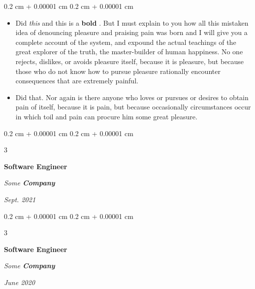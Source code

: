 \documentclass[10pt, letterpaper]{article}
\newenvironment{highlights}{
    \begin{itemize}[
        topsep=0.10 cm,
        parsep=0.10 cm,
        partopsep=0pt,
        itemsep=0pt,
        leftmargin=0.4 cm + 10pt + 0.6 cm
    ]
}{
    \end{itemize}
} %
\newenvironment{onecolentry}{
    \begin{adjustwidth}{
        0.2 cm + 0.00001 cm
    }{
        0.2 cm + 0.00001 cm
    }
}{
    \end{adjustwidth}
} %
\newenvironment{threecolentry}[3][]{
    \onecolentry
    \def\thirdColumn{#3}
    \setcolumnwidth{0.6 cm, \fill, 4.5 cm}
    \begin{paracol}{3}
    #2 \switchcolumn
}{
    \switchcolumn \raggedleft \thirdColumn
    \end{paracol}
    \endonecolentry
} %
\let\hrefWithoutArrow\href
\renewcommand{\href}[2]{\hrefWithoutArrow{#1}{\mbox{\ifthenelse{\equal{#2}{}}{ }{#2 }\raisebox{.15ex}{\footnotesize \faExternalLink*}}}}
\begin{document}
        \vspace{0.10 cm-3px}
        \begin{onecolentry}
            \begin{highlights}
                \item Did \textit{this} and this is a \textbf{bold} \href{https://example.com}{link}. But I must explain to you how all this mistaken idea of denouncing pleasure and praising pain was born and I will give you a complete account of the system, and expound the actual teachings of the great explorer of the truth, the master-builder of human happiness. No one rejects, dislikes, or avoids pleasure itself, because it is pleasure, but because those who do not know how to pursue pleasure rationally encounter consequences that are extremely painful.
                \item Did that. Nor again is there anyone who loves or pursues or desires to obtain pain of itself, because it is pain, but because occasionally circumstances occur in which toil and pain can procure him some great pleasure.
            \end{highlights}
        \end{onecolentry}


        \vspace{0.2 cm-3px}

        \begin{threecolentry}{
            \vspace*{\fill}
            \textbullet
            \vspace*{3px}
            \vspace*{\fill}
        }{
            
            
        \textit{Sept. 2021}}
            \textbf{Software Engineer}
            
            \textit{Some \textbf{Company}}
        \end{threecolentry}



        \vspace{0.2 cm-3px}

        \begin{threecolentry}{
            \vspace*{\fill}
            \textbullet
            \vspace*{3px}
            \vspace*{\fill}
        }{
            
            
        \textit{June 2020}}
            \textbf{Software Engineer}
            
            \textit{Some \textbf{Company}}
        \end{threecolentry}
\end{document}
